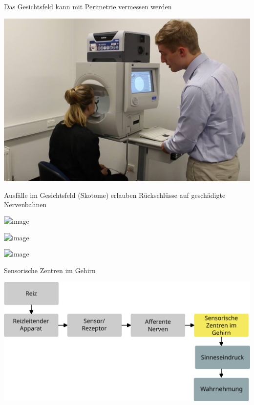 \documentclass{beamer}
\begin{document}
\begin{frame}{Das Gesichtsfeld kann mit Perimetrie vermessen werden}


\begin{cneter}
\includegraphics[width=\textwidth]{Perimetry_test.jpg}
\end{cneter}

    
\end{frame}


\begin{frame}{Ausfälle im Gesichtsfeld (Skotome) erlauben Rückschlüsse auf geschädigte Nervenbahnen}

\begin{center}
    \includegraphics<1>[width=0.6\textwidth]{Hemianopsien_raetsel.png}
    
    \includegraphics<2>[width=0.6\textwidth]{Hemianopsien_raetsel_rechts.png}

    \includegraphics<3>[width=0.6\textwidth]{Hemianopsien.png}
\end{center}


\end{frame}





\begin{frame}{Sensorische Zentren im Gehirn}
    
    \begin{center}
        \includegraphics[width=\textwidth]{wahrnehmungsprozess_ohne_beispiel_gehirn.png}
    \end{center}
    
\end{frame}
\end{document}
